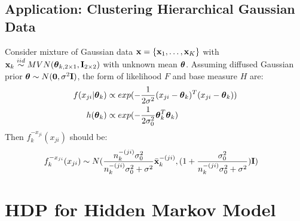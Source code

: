\documentclass{article} %
\begin{document}
\subsection{Application: Clustering Hierarchical Gaussian Data}
Consider mixture of Gaussian data ${\bf x} = \{ {\bf x}_1, \dots, {\bf x}_K \}$ with ${\bf x}_k \stackrel{iid}{\sim} MVN(\boldsymbol{\theta}_{k, 2 \times 1}, {\bf I}_{2 \times 2})$ with unknown mean $\boldsymbol{\theta}$. Assuming diffused Gaussian prior $\boldsymbol{\theta} \sim N({\bf 0}, \sigma^2 {\bf I})$, the form of likelihood $F$ and base measure $H$ are:
\begin{align*}
f(x_{ji} | \boldsymbol{\theta}_k )
&\propto
exp(-\frac{1}{2 \sigma^2} (x_{ji} - \boldsymbol{\theta}_k)^T(x_{ji} - \boldsymbol{\theta}_k))
\\
h(\boldsymbol{\theta}_k)
&\propto
exp(-\frac{1}{2\sigma_0^2}\boldsymbol{\theta}_k^T\boldsymbol{\theta}_k)
\end{align*}
Then $f_k^{-x_{ji}}(x_{ji})$ should be:
\begin{align*}
f_k^{-x_{ji}}(x_{ji}) & \sim
N( \frac{n_{k}^{-(ji)}\sigma_0^2}{ n_{k}^{-(ji)}\sigma_0^2 + \sigma^2}
\bar{{\bf x}}_k^{-(ji)},
(1 + \frac{\sigma_0^2}{n_{k}^{-(ji)} \sigma_0^2 + \sigma^2} ) {\bf I})
\end{align*}

\section{HDP for Hidden Markov Model}
\end{document}
